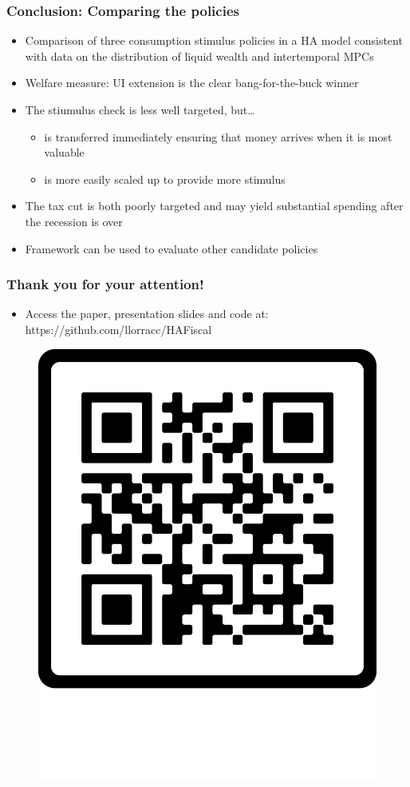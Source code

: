\documentclass[pdflatex,aspectratio=169]{beamer}
\begin{document}
\begin{frame}
	\frametitle{Conclusion: Comparing the policies}
	\begin{itemize}
		\itemsep = .5\bigskipamount 
		\item Comparison of three consumption stimulus policies in a HA model consistent with data on the distribution of liquid wealth and intertemporal MPCs 
		\item Welfare measure: UI extension is the clear bang-for-the-buck winner 
		\item The stiumulus check is less well targeted, but\ldots 
		\begin{itemize}
			\itemsep = .25\bigskipamount 
			\item is transferred immediately ensuring that money arrives when it is most valuable 
			\item is more easily scaled up to provide more stimulus 
		\end{itemize}
		\item The tax cut is both poorly targeted and may yield substantial spending after the recession is over 
		\item Framework can be used to evaluate other candidate policies 
		
	\end{itemize}
	
\end{frame}



\begin{frame}
	\frametitle{Thank you for your attention!}
	\begin{itemize} 
		\item Access the paper, presentation slides and code at: https://github.com/llorracc/HAFiscal
	\end{itemize}	

		\begin{figure}
			\centering
			\includegraphics[width=0.3\linewidth]{"Presentations/QRCode.png"}
		\end{figure}
	
\end{frame}
\end{document}

